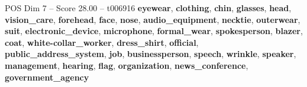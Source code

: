 \begin{textsample}{POS Dim 7 – Score 28.00 – t006916}  \label{ex:f7_pos_016}
\textbf{eyewear}, \textbf{clothing}, \textbf{chin}, \textbf{glasses}, \textbf{head}, \textbf{vision\_care}, \textbf{forehead}, \textbf{face}, \textbf{nose}, \textbf{audio\_equipment}, \textbf{necktie}, \textbf{outerwear}, \textbf{suit}, \textbf{electronic\_device}, \textbf{microphone}, \textbf{formal\_wear}, \textbf{spokesperson}, \textbf{blazer}, \textbf{coat}, \textbf{white-collar\_worker}, \textbf{dress\_shirt}, \textbf{official}, \textbf{public\_address\_system}, \textbf{job}, \textbf{businessperson}, \textbf{speech}, \textbf{wrinkle}, \textbf{speaker}, \textbf{management}, \textbf{hearing}, \textbf{flag}, \textbf{organization}, \textbf{news\_conference}, \textbf{government\_agency}

\end{textsample}
